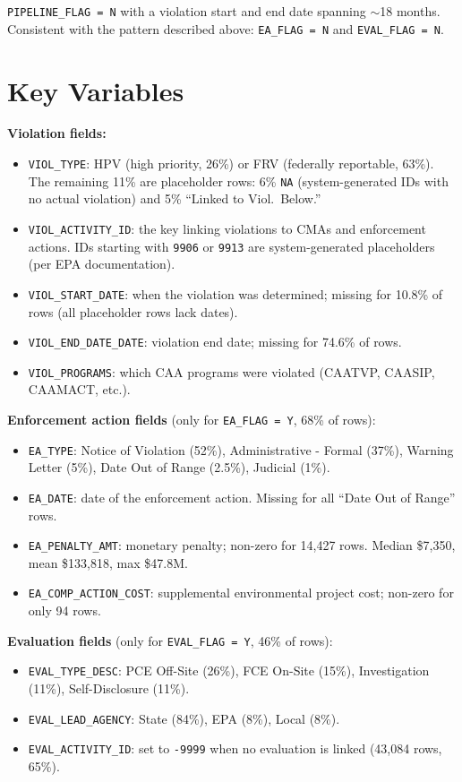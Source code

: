 \documentclass[11pt]{article}
\begin{document}
\noindent \texttt{PIPELINE\_FLAG = N} with a violation start and end date spanning $\sim$18 months. Consistent with the pattern described above: \texttt{EA\_FLAG = N} and \texttt{EVAL\_FLAG = N}.

\section{Key Variables}

\textbf{Violation fields:}
\begin{itemize}[nosep]
  \item \texttt{VIOL\_TYPE}: HPV (high priority, 26\%) or FRV (federally reportable, 63\%). The remaining 11\% are placeholder rows: 6\% \texttt{NA} (system-generated IDs with no actual violation) and 5\% ``Linked to Viol.\ Below.''
  \item \texttt{VIOL\_ACTIVITY\_ID}: the key linking violations to CMAs and enforcement actions. IDs starting with \texttt{9906} or \texttt{9913} are system-generated placeholders (per EPA documentation).
  \item \texttt{VIOL\_START\_DATE}: when the violation was determined; missing for 10.8\% of rows (all placeholder rows lack dates).
  \item \texttt{VIOL\_END\_DATE\_DATE}: violation end date; missing for 74.6\% of rows.
  \item \texttt{VIOL\_PROGRAMS}: which CAA programs were violated (CAATVP, CAASIP, CAAMACT, etc.).
\end{itemize}

\textbf{Enforcement action fields} (only for \texttt{EA\_FLAG = Y}, 68\% of rows):
\begin{itemize}[nosep]
  \item \texttt{EA\_TYPE}: Notice of Violation (52\%), Administrative - Formal (37\%), Warning Letter (5\%), Date Out of Range (2.5\%), Judicial (1\%).
  \item \texttt{EA\_DATE}: date of the enforcement action. Missing for all ``Date Out of Range'' rows.
  \item \texttt{EA\_PENALTY\_AMT}: monetary penalty; non-zero for 14,427 rows. Median \$7,350, mean \$133,818, max \$47.8M.
  \item \texttt{EA\_COMP\_ACTION\_COST}: supplemental environmental project cost; non-zero for only 94 rows.
\end{itemize}

\textbf{Evaluation fields} (only for \texttt{EVAL\_FLAG = Y}, 46\% of rows):
\begin{itemize}[nosep]
  \item \texttt{EVAL\_TYPE\_DESC}: PCE Off-Site (26\%), FCE On-Site (15\%), Investigation (11\%), Self-Disclosure (11\%).
  \item \texttt{EVAL\_LEAD\_AGENCY}: State (84\%), EPA (8\%), Local (8\%).
  \item \texttt{EVAL\_ACTIVITY\_ID}: set to \texttt{-9999} when no evaluation is linked (43,084 rows, 65\%).
\end{itemize}
\end{document}
